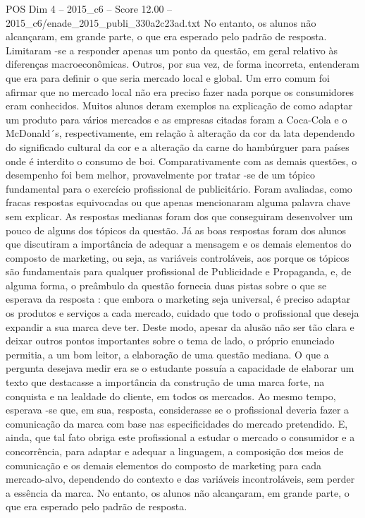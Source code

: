 \begin{textsample}{POS Dim 4 – 2015\_c6 – Score 12.00 – 2015\_c6/enade\_2015\_publi\_330a2c23ad.txt}
No entanto, os alunos não alcançaram, em grande parte, o que era esperado pelo padrão de resposta.
Limitaram -se a responder apenas um ponto da questão, em geral relativo às diferenças macroeconômicas.
Outros, por sua vez, de forma incorreta, entenderam que era para definir o que seria mercado local e global.
Um erro comum foi afirmar que no mercado local não era preciso fazer nada porque os consumidores eram conhecidos.
Muitos alunos deram exemplos na explicação de como adaptar um produto para vários mercados e as empresas citadas foram a Coca-Cola e o McDonald´s, respectivamente, em relação à alteração da cor da lata dependendo do significado cultural da cor e a alteração da carne do hambúrguer para países onde é interdito o consumo de boi.
Comparativamente com as demais questões, o desempenho foi bem melhor, provavelmente por tratar -se de um tópico fundamental para o exercício profissional de publicitário.
Foram avaliadas, como fracas respostas equivocadas ou que apenas mencionaram alguma palavra chave sem explicar.
As respostas medianas foram dos que conseguiram desenvolver um pouco de alguns dos tópicos da questão.
Já as boas respostas foram dos alunos que discutiram a importância de adequar a mensagem e os demais elementos do composto de marketing, ou seja, as variáveis controláveis, aos porque os tópicos são fundamentais para qualquer profissional de Publicidade e Propaganda, e, de alguma forma, o preâmbulo da questão fornecia duas pistas sobre o que se esperava da resposta : que embora o marketing seja universal, é preciso adaptar os produtos e serviços a cada mercado, cuidado que todo o profissional que deseja expandir a sua marca deve ter.
Deste modo, apesar da alusão não ser tão clara e deixar outros pontos importantes sobre o tema de lado, o próprio enunciado permitia, a um bom leitor, a elaboração de uma questão mediana.
O que a pergunta desejava medir era se o estudante possuía a capacidade de elaborar um texto que destacasse a importância da construção de uma marca forte, na conquista e na lealdade do cliente, em todos os mercados.
Ao mesmo tempo, esperava -se que, em sua, resposta, considerasse se o profissional deveria fazer a comunicação da marca com base nas especificidades do mercado pretendido.
E, ainda, que tal fato obriga este profissional a estudar o mercado o consumidor e a concorrência, para adaptar e adequar a linguagem, a composição dos meios de comunicação e os demais elementos do composto de marketing para cada mercado-alvo, dependendo do contexto e das variáveis incontroláveis, sem perder a essência da marca.
No entanto, os alunos não alcançaram, em grande parte, o que era esperado pelo padrão de resposta.

\end{textsample}
